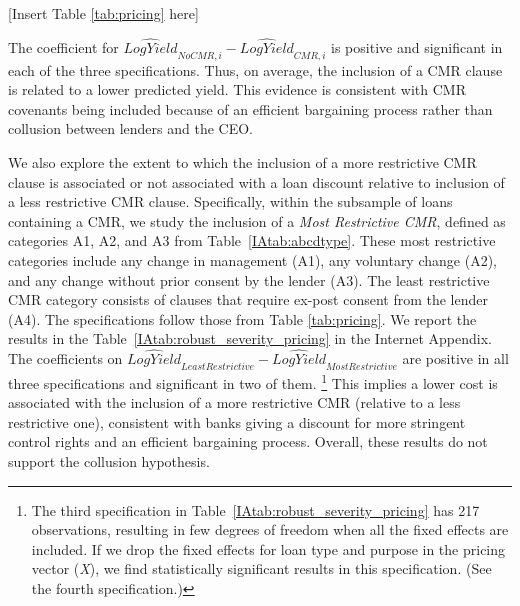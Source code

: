 \documentclass[a4paper,12pt]{article}
\begin{document}
\begin{center}
  [Insert Table \ref{tab:pricing} here]
\end{center}


The coefficient for $\widehat{LogYield}_{NoCMR,i} - \widehat{LogYield}_{CMR,i}$ is positive and significant in each of the three specifications.
Thus, on average, the inclusion of a CMR clause is related to a lower predicted yield.
This evidence is consistent with CMR covenants being included because of an efficient bargaining process rather than collusion between lenders and the CEO.


We also explore the extent to which the inclusion of a more restrictive CMR clause is associated or not associated with a loan discount relative to inclusion of a less restrictive CMR clause.
Specifically, within the subsample of loans containing a CMR, we study the inclusion of a \textit{Most Restrictive CMR}, defined as categories A1, A2, and A3 from Table~\ref{IAtab:abcdtype}.
These most restrictive categories include any change in management (A1), any voluntary change (A2), and any change without prior consent by the lender (A3).
The least restrictive CMR category consists of clauses that require ex-post consent from the lender (A4).
The specifications follow those from Table \ref{tab:pricing}.
We report the results in the Table~\ref{IAtab:robust_severity_pricing} in the Internet Appendix. 
The coefficients on  $ \widehat{LogYield}_{Least Restrictive}-\widehat{LogYield}_{Most Restrictive} $ are  positive in all three specifications and significant in two of them.%
    \footnote{The third specification in Table~\ref{IAtab:robust_severity_pricing} has 217 observations, resulting in few degrees of freedom when all the fixed effects are included. If we drop the fixed effects for loan type and purpose in the pricing vector (\textit{X}), we find statistically significant results in this specification. (See the fourth specification.)} 
This implies a lower cost is associated with the inclusion of a more restrictive CMR (relative to a less restrictive one), consistent with banks giving a discount for more stringent control rights and an efficient bargaining process.
Overall, these results do not support the collusion hypothesis.











\end{document}
